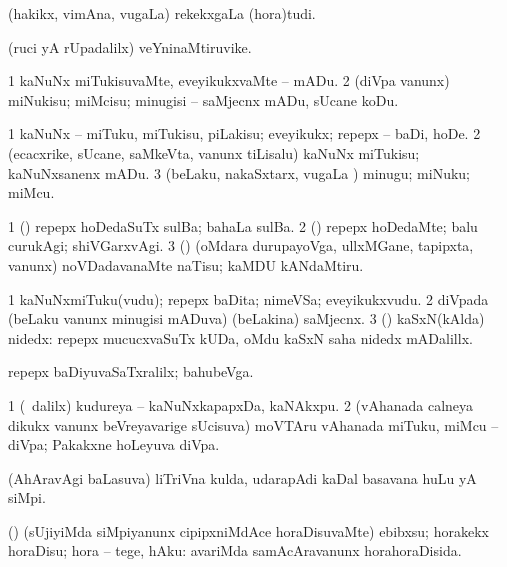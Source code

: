 {{{{{{\bentry
{}
\gl{\nA}
\bmng
{} 
\emng
\eentry

\bentry
{}
  \gl{\nA}\bmng
(hakikx, vimAna, \mo vugaLa) rekekxgaLa (hora)tudi. 
\emng
\eentry

\bentry
{}
  \gl{\nA}\bmng
(ruci yA rUpadalilx) veYninaMtiruvike. 
\emng
\eentry

\bentry
{} 
\gl{\sakirx}
\expl{}
\bmng
\bnum
\num{1} kaNuNx miTukisuvaMte, eveyikukxvaMte -- mADu. 
\num{2} (diVpa \mo vanunx) miNukisu; miMcisu; minugisi -- saMjecnx mADu, sUcane koDu. 
\enum
\emng

\noindent
\gl{\akirx}
\expl{}
\bmng
\bnum
\num{1} kaNuNx -- miTuku, miTukisu, piLakisu; eveyikukx; repepx -- baDi, hoDe. 
\num{2} (ecacxrike, sUcane, saMkeVta, \mo vanunx tiLisalu) kaNuNx miTukisu; kaNuNxsanenx mADu. 
\num{3} (beLaku, nakaSxtarx, \mo vugaLa \vi) minugu; miNuku; miMcu. 
\enum
\emng

\noindent
\gl{\pagu}
\expl{}
\bmng
\bnum
\num{1}  (\AmA) repepx hoDedaSuTx sulBa; bahaLa sulBa. 
\num{2}  (\ashi) repepx hoDedaMte; balu curukAgi; shiVGarxvAgi. 
\num{3}  (\rUpa) (oMdara durupayoVga, ullxMGane, tapipxta, \mo vanunx) noVDadavanaMte naTisu; kaMDU kANdaMtiru. 
\enum
\emng
\eentry

\bentry
{}
 \gl{\nA}
\expl{}
\bmng
\bnum
\num{1} kaNuNxmiTuku(vudu); repepx baDita; nimeVSa; eveyikukxvudu. 
\num{2} diVpada (beLaku \mo vanunx minugisi mADuva) (beLakina) saMjecnx. 
\num{3} (\AmA) kaSxN(kAlda) nidedx:  repepx mucucxvaSuTx kUDa, oMdu kaSxN saha nidedx mADalillx. 
\enum
\emng

\noindent
\gl{\pagu}
\bmng
{} repepx baDiyuvaSaTxralilx; bahubeVga. 
\emng
\eentry

\bentry
{}
\gl{\nA}
\bmng
\bnum
\num{1} (\sA\ \bava dalilx) kudureya -- kaNuNxkapapxDa, kaNAkxpu. 
\num{2} (vAhanada calneya dikukx \mo vanunx beVreyavarige sUcisuva) moVTAru vAhanada miTuku, miMcu -- diVpa; Pakakxne hoLeyuva diVpa. 
\enum
\emng
\eentry

\bentry
{} 
\gl{\nA}
\expl{}
\bmng
(AhAravAgi baLasuva) liTriVna kulda, udarapAdi kaDal basavana huLu yA siMpi. 
\emng
\eentry

\bentry
{} 
\gl{\sakirx}
\bmng
(\birx) (sUjiyiMda siMpiyanunx cipipxniMdAce horaDisuvaMte) ebibxsu; horakekx horaDisu; hora -- tege, hAku:  avariMda samAcAravanunx horahoraDisida. 
\emng
\eentry

}}}}}}
